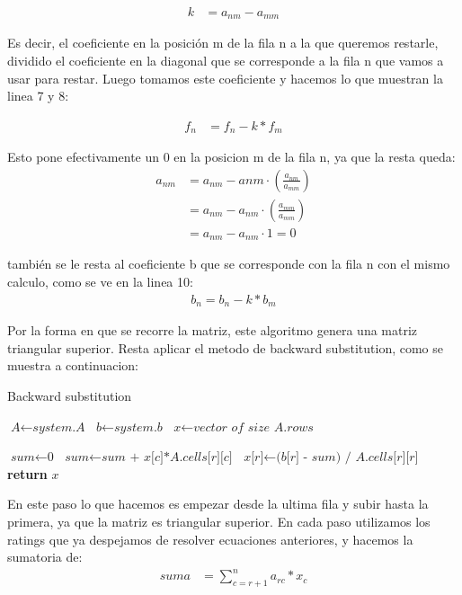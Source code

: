 \documentclass[a4paper]{article}
\begin{document}
\begin{align*}
k &= a_{nm} - a_{mm}
\end{align*}

Es decir, el coeficiente en la posición m de la fila n a la que queremos restarle, dividido el coeficiente en la diagonal que se corresponde a la fila n que vamos a usar para restar. Luego tomamos este coeficiente y hacemos lo que muestran la linea 7 y 8:

\begin{align*}
f_{n} &= f_{n} - k* f_{m}
\end{align*}

Esto pone efectivamente un 0 en la posicion m de la fila n, ya que la resta queda:
\begin{align*}
a_{nm} &= a_{nm} - a{nm}\cdot(\frac{a_{nm}}{a_{mm}})\\
&= a_{nm} - a_{nm}\cdot(\frac{a_{mm}}{a_{mm}})\\
&= a_{nm} - a_{nm}\cdot1 = 0
\end{align*}

también se le resta al coeficiente b que se corresponde con la fila n con el mismo calculo, como se ve en la linea 10: 
\begin{align*}
b_{n} = b_{n} - k * b_{m}
\end{align*}

Por la forma en que se recorre la matriz, este algoritmo genera una matriz triangular superior. Resta aplicar el metodo de backward substitution, como se muestra a continuacion:

\begin{algorithm}
\caption{Backward substitution}\label{bs}
\begin{algorithmic}[1]


\State $\textit{A} \gets \textit{system.A}$
\State $\textit{b} \gets \textit{system.b}$
\State $\textit{x} \gets \textit{vector of size A.rows}$

    \State $\textit{sum} \gets \textit{0}$
        \State $\textit{sum} \gets \textit{sum + x[c]*A.cells[r][c]}$
    \EndFor
	\State $\textit{x[r]} \gets \textit{(b[r] - sum) / A.cells[r][r]}$
\EndFor
\State \textbf{return} $\textit{x}$
\EndProcedure
\end{algorithmic}
\end{algorithm}

En este paso lo que hacemos es empezar desde la ultima fila y subir hasta la primera, ya que la matriz es triangular superior. En cada paso utilizamos los ratings que ya despejamos de resolver ecuaciones anteriores, y hacemos la sumatoria de:
\begin{align*}
suma &= \sum_{c=r+1}^{n} a_{rc} * x_{c} 
\end{align*}
\end{document}
